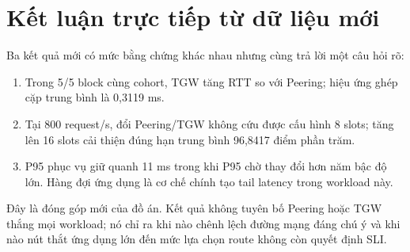 \section{Kết luận trực tiếp từ dữ liệu mới}

Ba kết quả mới có mức bằng chứng khác nhau nhưng cùng trả lời một câu hỏi rõ:

\begin{enumerate}
  \item Trong 5/5 block cùng cohort, TGW tăng RTT so với Peering; hiệu ứng ghép
        cặp trung bình là 0,3119 ms.
  \item Tại 800 request/s, đổi Peering/TGW không cứu được cấu hình 8 slots;
        tăng lên 16 slots cải thiện đúng hạn trung bình 96,8417 điểm phần trăm.
  \item P95 phục vụ giữ quanh 11 ms trong khi P95 chờ thay đổi hơn năm bậc độ
        lớn. Hàng đợi ứng dụng là cơ chế chính tạo tail latency trong workload
        này.
\end{enumerate}

Đây là đóng góp mới của đồ án. Kết quả không tuyên bố Peering hoặc TGW thắng
mọi workload; nó chỉ ra khi nào chênh lệch đường mạng đáng chú ý và khi nào
nút thắt ứng dụng lớn đến mức lựa chọn route không còn quyết định SLI.
